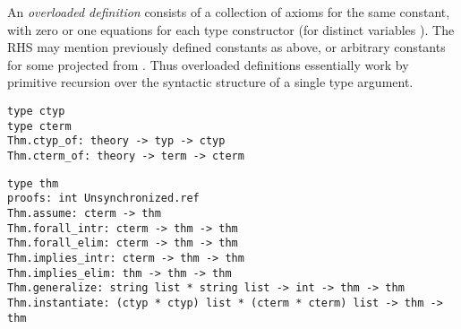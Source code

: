 \begin{isabellebody}
\begin{isamarkuptext}
  An \emph{overloaded definition} consists of a collection of axioms
  for the same constant, with zero or one equations  for each type constructor \isa{{\isasymkappa}} (for
  distinct variables \isa{\isactrlvec {\isasymalpha}}).  The RHS may mention
  previously defined constants as above, or arbitrary constants  for some  projected from \isa{\isactrlvec {\isasymalpha}}.  Thus overloaded definitions essentially work by
  primitive recursion over the syntactic structure of a single type
  argument.%
\end{isamarkuptext}%
\isamarkuptrue%
%
\isadelimmlref
%
\endisadelimmlref
%
\isatagmlref
%
\begin{isamarkuptext}%
\begin{mldecls}
  \verb|type ctyp| \\
  \verb|type cterm| \\
  \verb|Thm.ctyp_of: theory -> typ -> ctyp| \\
  \verb|Thm.cterm_of: theory -> term -> cterm| \\
  \end{mldecls}
  \begin{mldecls}
  \verb|type thm| \\
  \verb|proofs: int Unsynchronized.ref| \\
  \verb|Thm.assume: cterm -> thm| \\
  \verb|Thm.forall_intr: cterm -> thm -> thm| \\
  \verb|Thm.forall_elim: cterm -> thm -> thm| \\
  \verb|Thm.implies_intr: cterm -> thm -> thm| \\
  \verb|Thm.implies_elim: thm -> thm -> thm| \\
  \verb|Thm.generalize: string list * string list -> int -> thm -> thm| \\
  \verb|Thm.instantiate: (ctyp * ctyp) list * (cterm * cterm) list -> thm -> thm| \\

\end{mldecls}
\end{isamarkuptext}
\end{isabellebody}

